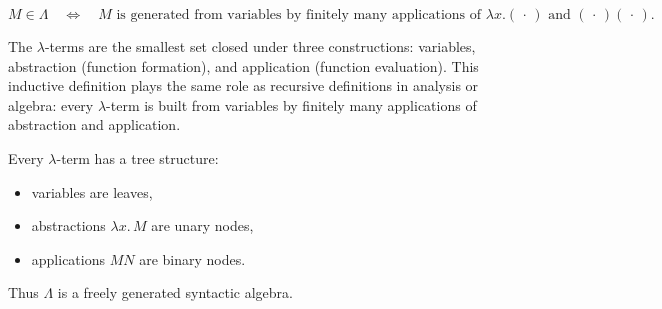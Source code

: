 \begin{remark*}
\[
M \in \Lambda
\quad\Longleftrightarrow\quad
M \text{ is generated from variables by finitely many applications of }
\lambda x.(\,\cdot\,) \text{ and } (\,\cdot\,)(\,\cdot\,).
\]
\end{remark*}

\begin{remark*}[Interpretation]
The $\lambda$-terms are the smallest set closed under three constructions:
variables, abstraction (function formation), and application (function
evaluation). This inductive definition plays the same role as recursive
definitions in analysis or algebra: every $\lambda$-term is built from
variables by finitely many applications of abstraction and application.
\end{remark*}

\begin{remark*}
Every $\lambda$-term has a tree structure:
\begin{itemize}
    \item variables are leaves,
    \item abstractions $\lambda x.\,M$ are unary nodes,
    \item applications $MN$ are binary nodes.
\end{itemize}
Thus $\Lambda$ is a freely generated syntactic algebra.
\end{remark*}
